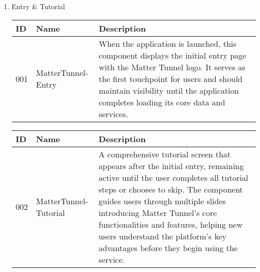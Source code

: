 \documentclass[conference]{IEEEtran}
\begin{document}
\begin{enumerate}[itemsep=2ex, parsep=1ex]
	\item Entry \& Tutorial
	      \begin{table}[h!]
	      	\def\arraystretch{1.24} \small
	      	\begin{tabular}{|p{1.2cm}|p{2.5cm}|p{4.0cm}|}
	      		\hline
	      		ID  & Name               & Description                                                                                                                                                                                                                                                  \\
	      		\hline
	      		001 & MatterTunnel-Entry & When the application is launched, this component displays the initial entry page with the Matter Tunnel logo. It serves as the first touchpoint for users and should maintain visibility until the application completes loading its core data and services. \\
	      		\hline
	      	\end{tabular}
	      \end{table}
	      
	      \begin{table}[h!]
	      	\def\arraystretch{1.24} \small
	      	\begin{tabular}{|p{1.2cm}|p{2.5cm}|p{4.0cm}|}
	      		\hline
	      		ID  & Name                  & Description                                                                                                                                                                                                                                                                                                                                                              \\
	      		\hline
	      		002 & MatterTunnel-Tutorial & A comprehensive tutorial screen that appears after the initial entry, remaining active until the user completes all tutorial steps or chooses to skip. The component guides users through multiple slides introducing Matter Tunnel's core functionalities and features, helping new users understand the platform's key advantages before they begin using the service. \\
	      		\hline
	      	\end{tabular}
	      \end{table}
	          

\end{enumerate}
\end{document}
